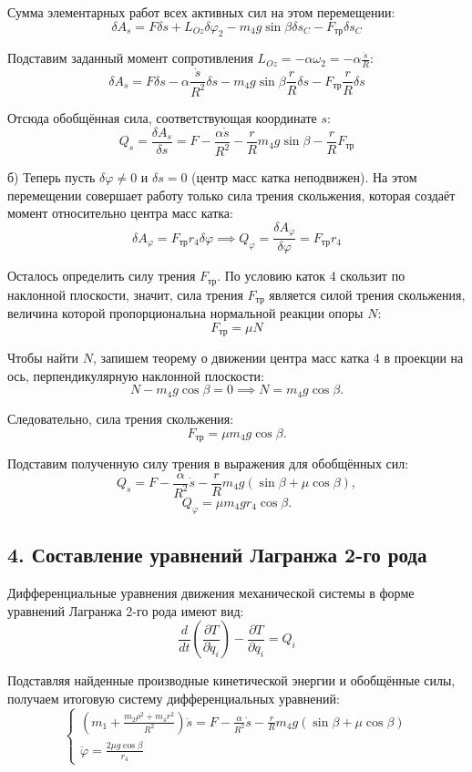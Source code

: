 \documentclass{article}
\begin{document}
Сумма элементарных работ всех активных сил на этом перемещении:
$$ 
\delta A_s = F \delta s + L_{Oz} \delta \varphi_2 - m_4 g \sin\beta \delta s_C - F_{\text{тр}} \delta s_C
$$
\par
Подставим заданный момент сопротивления $L_{Oz} = -\alpha \omega_2 = -\alpha \frac{\dot{s}}{R}$:
$$
\delta A_s = F \delta s - \alpha \frac{\dot{s}}{R^2} \delta s - m_4 g \sin\beta \frac{r}{R} \delta s - F_{\text{тр}} \frac{r}{R} \delta s
$$
\par
Отсюда обобщённая сила, соответствующая координате $s$:
$$
Q_s = \frac{\delta A_s}{\delta s} = F - \frac{\alpha \dot{s}}{R^2} - \frac{r}{R} m_4 g \sin\beta - \frac{r}{R} F_{\text{тр}}
$$
\par
\vspace{0.2cm}
б) Теперь пусть $\delta \varphi \neq 0$ и $\delta s = 0$ (центр масс катка неподвижен). На этом перемещении совершает работу только сила трения скольжения, которая создаёт момент относительно центра масс катка:
$$ 
\delta A_\varphi = F_{\text{тр}} r_4 \delta \varphi \implies Q_\varphi = \frac{\delta A_\varphi}{\delta \varphi} = F_{\text{тр}} r_4
$$
\par
\vspace{0.2cm}
Осталось определить силу трения $F_{\text{тр}}$. По условию каток 4 скользит по наклонной плоскости, значит, сила трения $F_{\text{тр}}$ является силой трения скольжения, величина которой пропорциональна нормальной реакции опоры $N$: 
$$
F_{\text{тр}} = \mu N
$$
\par
Чтобы найти $N$, запишем теорему о движении центра масс катка 4 в проекции на ось, перпендикулярную наклонной плоскости:
$$ 
N - m_4 g \cos\beta = 0 \implies N = m_4 g \cos\beta. 
$$
\par
Следовательно, сила трения скольжения:
$$
F_{\text{тр}} = \mu m_4 g \cos\beta. 
$$

Подставим полученную силу трения в выражения для обобщённых сил:
$$ Q_s = F - \frac{\alpha}{R^2} \dot{s} - \frac{r}{R} m_4 g (\sin\beta + \mu \cos\beta), $$
$$ Q_\varphi = \mu m_4 g r_4 \cos\beta. $$

\subsection*{4. Составление уравнений Лагранжа 2-го рода}
Дифференциальные уравнения движения механической системы в форме уравнений Лагранжа 2-го рода имеют вид:
$$ 
\frac{d}{dt} \left( \frac{\partial T}{\partial \dot{q}_i} \right) - \frac{\partial T}{\partial q_i} = Q_i
$$
\par
Подставляя найденные производные кинетической энергии и обобщённые силы, получаем итоговую систему дифференциальных уравнений:
\begin{equation*}
	\begin{cases}
		\left( m_1 + \frac{m_2 \rho^2 + m_4 r^2}{R^2} \right) \ddot{s} = F - \frac{\alpha}{R^2} \dot{s} - \frac{r}{R} m_4 g (\sin \beta + \mu \cos \beta) \\
		\ddot{\varphi} = \frac{2 \mu g \cos \beta}{r_4}
	\end{cases}
\end{equation*}
\end{document}
